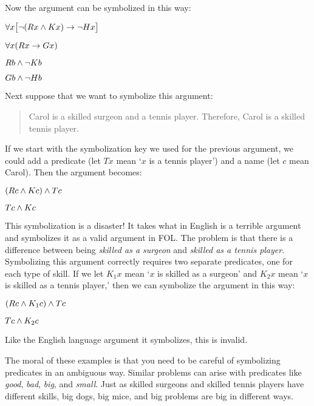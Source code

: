 Now the argument can be symbolized in this way:
\begin{earg}
\label{surgeon2}
\item[] $\forall x\bigl[\neg (Rx \wedge Kx) \rightarrow \neg Hx\bigr]$
\item[] $\forall x(Rx \rightarrow Gx)$
\item[] $Rb \wedge \neg Kb$
\item[\therefore] $Gb \wedge \neg Hb$
\end{earg}

Next suppose that we want to symbolize this argument:
\begin{quote}
\label{surgeon3}
Carol is a skilled surgeon and a tennis player. Therefore, Carol is a skilled tennis player.
\end{quote}
If we start with the symbolization key we used for the previous argument, we could add a predicate (let $Tx$ mean `$x$ is a tennis player') and a name (let $c$ mean Carol). Then the argument becomes:
\begin{earg}
\item[] $(Rc \wedge Kc) \wedge Tc$
\item[\therefore] $Tc \wedge Kc$
\end{earg}
This symbolization is a disaster! It takes what in English is a terrible argument and symbolizes it as a valid argument in FOL. The problem is that there is a difference between being \emph{skilled as a surgeon} and \emph{skilled as a tennis player}. Symbolizing this argument correctly requires two separate predicates, one for each type of skill. If we let $K_1x$ mean `$x$ is skilled as a surgeon' and $K_2x$ mean `$x$ is skilled as a tennis player,' then we can symbolize the argument in this way:
\begin{earg}
\label{surgeon3correct}
\item[] $(Rc \wedge K_1c) \wedge Tc$
\item[\therefore] $Tc \wedge K_2c$
\end{earg}
Like the English language argument it symbolizes, this is invalid. %

The moral of these examples is that you need to be careful of symbolizing predicates in an ambiguous way. Similar problems can arise with predicates like \emph{good}, \emph{bad}, \emph{big}, and \emph{small}. Just as skilled surgeons and skilled tennis players have different skills, big dogs, big mice, and big problems are big in different ways.

